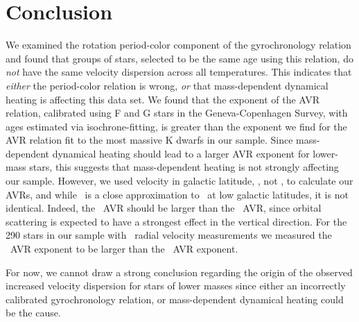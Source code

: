 \section{Conclusion}

We examined the rotation period-color component of the \citep{angus2019}
gyrochronology relation and found that groups of stars, selected to be the
same age using this relation, do {\it not} have the same velocity dispersion
across all temperatures.
This indicates that {\it either} the \citep{angus2019} period-color relation
is wrong, {\it or} that mass-dependent dynamical heating is affecting this
data set.
We found that the exponent of the AVR relation, calibrated using F and G stars
in the Geneva-Copenhagen Survey, with ages estimated via isochrone-fitting, is
greater than the exponent we find for the AVR relation fit to the most massive
K dwarfs in our sample.
Since mass-dependent dynamical heating should lead to a larger AVR exponent
for lower-mass stars, this suggests that mass-dependent heating is not
strongly affecting our sample.
However, we used velocity in galactic latitude, \vb, not \vz, to calculate our
AVRs, and while \vb\ is a close approximation to \vz\ at low galactic
latitudes, it is not identical.
Indeed, the \vz\ AVR should be larger than the \vb\ AVR, since orbital
scattering is expected to have a strongest effect in the vertical direction.
For the 290 stars in our sample with \gaia\ radial velocity measurements we
measured the \vz\ AVR exponent to be larger than the \vb\ AVR exponent.

For now, we cannot draw a strong conclusion regarding the origin of the
observed increased velocity dispersion for stars of lower masses since either
an incorrectly calibrated gyrochronology relation, or mass-dependent dynamical
heating could be the cause.
